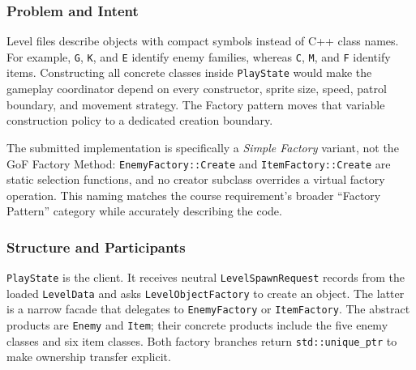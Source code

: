 \documentclass{template}
\begin{document}
\subsubsection{Problem and Intent}

Level files describe objects with compact symbols instead of C++ class names.
For example, \texttt{G}, \texttt{K}, and \texttt{E} identify enemy families,
whereas \texttt{C}, \texttt{M}, and \texttt{F} identify items. Constructing all
concrete classes inside \texttt{PlayState} would make the gameplay coordinator
depend on every constructor, sprite size, speed, patrol boundary, and movement
strategy. The Factory pattern moves that variable construction policy to a
dedicated creation boundary.

The submitted implementation is specifically a \emph{Simple Factory}
variant, not the GoF Factory Method: \texttt{EnemyFactory::Create} and
\texttt{ItemFactory::Create} are static selection functions, and no creator
subclass overrides a virtual factory operation. This naming matches the course
requirement's broader ``Factory Pattern'' category while accurately describing
the code.

\subsubsection{Structure and Participants}

\texttt{PlayState} is the client. It receives neutral
\texttt{LevelSpawnRequest} records from the loaded \texttt{LevelData} and asks
\texttt{LevelObjectFactory} to create an object. The latter is a narrow facade
that delegates to \texttt{EnemyFactory} or \texttt{ItemFactory}. The abstract
products are \texttt{Enemy} and \texttt{Item}; their concrete products include
the five enemy classes and six item classes. Both factory branches return
\texttt{std::unique\_ptr} to make ownership transfer explicit.
\end{document}
